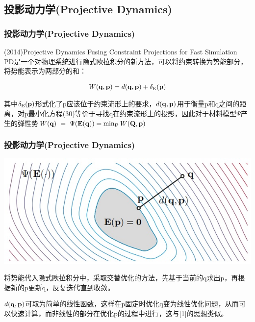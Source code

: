 \documentclass[aspectratio=43]{ctexbeamer}
\begin{document}
\subsection{投影动力学(Projective Dynamics)}
\begin{frame}
  \frametitle{投影动力学(Projective Dynamics)}
	(2014)Projective Dynamics Fusing Constraint Projections for Fast Simulation\\[10pt]

		PD是一个对物理系统进行隐式欧拉积分的新方法，可以将约束转换为势能部分，将势能表示为两部分的和：

       \begin{equation}
			W({\bf q},{\bf p})=d({\bf q},{\bf p})+\delta_{\mathrm{E}}({\bf p})
		\end{equation}

		其中$\delta_{\mathrm{E}}({\bf p})$形式化了p应该位于约束流形上的要求，$d({\bf q},{\bf p})$用于衡量p和q之间的距离，对p最小化方程(30)等价于寻找q在约束流形上的投影，因此对于材料模型$\Psi$产生的弹性势$W({\bf{q}})\,\,=\,\,\Psi({\bf{E}}({\bf{q}}))=\operatorname*{min}_{\mathbf{P}}W(\mathbf{Q},\mathbf{p})$
\end{frame}

\begin{frame}
  \frametitle{投影动力学(Projective Dynamics)}
        \begin{center}
            \includegraphics[width=1.0\linewidth]{./fig/材料弹性势.jpg}
        \end{center}
		\; \;将势能代入隐式欧拉积分中，采取交替优化的方法，先基于当前的q求出p，再根据新的p更新q，反复迭代直到收敛。

		\; \;$d({\bf q},{\bf p})$可取为简单的线性函数，这样在p固定时优化q变为线性优化问题，从而可以快速计算，而非线性的部分在优化p的过程中进行，这与[1]的思想类似。
\end{frame}
\end{document}
